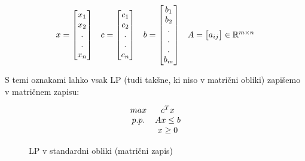 \documentclass[11pt, a4paper]{article}
\begin{document}
    \begin{figure}[H]
        \[
            \begin{array}{ c c c c }
                x = 
                \begin{bmatrix}
                    x_1 \\
                    x_2 \\
                    . \\
                    . \\
                    x_n    
                \end{bmatrix}
                &
                c =
                \begin{bmatrix}
                    c_1 \\
                    c_2 \\
                    . \\
                    . \\
                    c_n
                \end{bmatrix}
                &
                b = 
                \begin{bmatrix}
                    b_1 \\
                    b_2 \\
                    . \\
                    . \\
                    . \\
                    b_m
                \end{bmatrix}
                &
                A = 
                \begin{bmatrix}
                    a_{ij}    
                \end{bmatrix}
                \in \mathbb{R}^{m \times n}
            \end{array}
        \]
    \end{figure}
    
    \par
    S temi oznakami lahko vsak LP (tudi takšne, ki niso v matrični obliki) zapišemo v matričnem zapisu:
    
    \begin{figure}[H]
        \[
            \begin{array}{ c c }
                max & c^Tx \\
                p.p. & Ax \le b \\
                & x \ge 0 \\
            \end{array}
        \]
        \caption{LP v standardni obliki (matrični zapis)}
    \end{figure}
    
\end{document}
